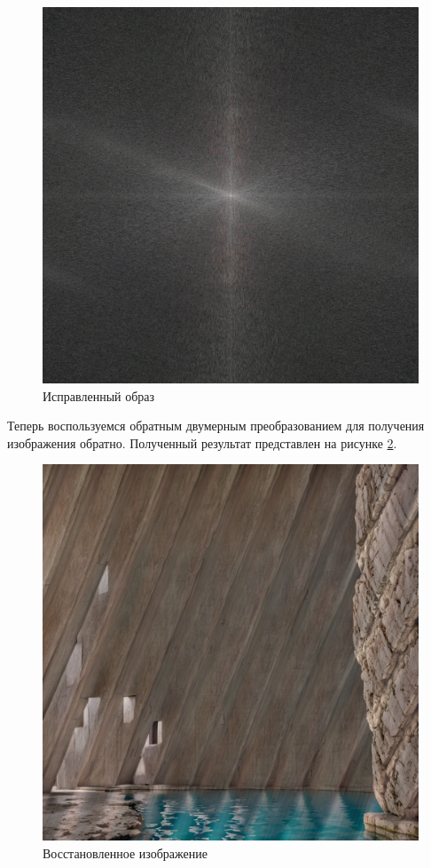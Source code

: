 \begin{figure}[ht!]
    \centering
    \includegraphics[width=\textwidth]{fixed.png}
    \caption{Исправленный образ}
    \label{img:fixed}
\end{figure}

Теперь воспользуемся обратным двумерным преобразованием для получения изображения обратно. Полученный результат представлен на рисунке \ref{img:restored}. 

\begin{figure}[ht!]
    \centering
    \includegraphics[width=\textwidth]{restored.png}
    \caption{Восстановленное изображение}
    \label{img:restored}
\end{figure}

